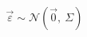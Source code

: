 \documentclass[preview]{standalone}
\begin{document}
\begin{align*}
\vec{\varepsilon} \sim \mathcal{N}\!\left(\vec{0},\ \Sigma\right)
\end{align*}
\end{document}
